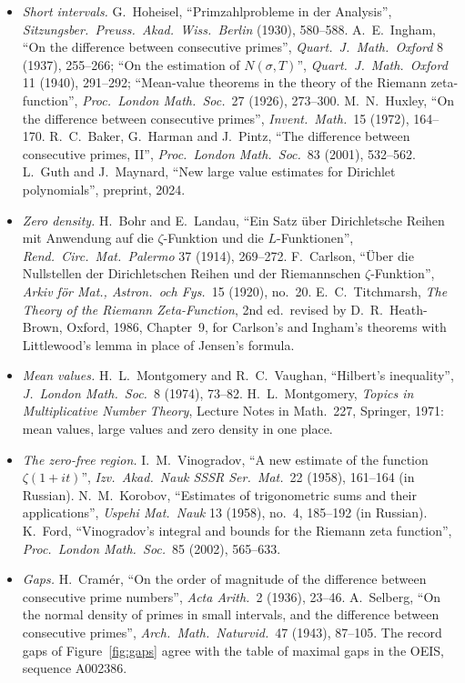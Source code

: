 \begin{itemize}
\item \emph{Short intervals.} G.~Hoheisel, ``Primzahlprobleme in der Analysis'', \emph{Sitzungsber.\ Preuss.\ Akad.\ Wiss.\ Berlin} (1930), 580--588. A.~E.~Ingham, ``On the difference between consecutive primes'', \emph{Quart.\ J.\ Math.\ Oxford} 8 (1937), 255--266; ``On the estimation of $N(\sigma,T)$'', \emph{Quart.\ J.\ Math.\ Oxford} 11 (1940), 291--292; ``Mean-value theorems in the theory of the Riemann zeta-function'', \emph{Proc.\ London Math.\ Soc.}\ 27 (1926), 273--300. M.~N.~Huxley, ``On the difference between consecutive primes'',
\emph{Invent.\ Math.}\ 15 (1972), 164--170. R.~C.~Baker, G.~Harman and J.~Pintz, ``The difference between consecutive primes, II'', \emph{Proc.\ London Math.\ Soc.}\ 83 (2001), 532--562. L.~Guth and J.~Maynard, ``New large value estimates for Dirichlet polynomials'', preprint, 2024.
\item \emph{Zero density.} H.~Bohr and E.~Landau, ``Ein Satz \"uber Dirichletsche Reihen mit Anwendung auf die $\zeta$-Funktion und die $L$-Funktionen'', \emph{Rend.\ Circ.\ Mat.\ Palermo} 37 (1914), 269--272. F.~Carlson, ``\"Uber die Nullstellen der Dirichletschen Reihen und der Riemannschen $\zeta$-Funktion'', \emph{Arkiv f\"or Mat., Astron.\ och Fys.}\ 15 (1920), no.~20.
E.~C.~Titchmarsh, \emph{The Theory of the Riemann Zeta-Function}, 2nd ed.\ revised by D.~R.~Heath-Brown, Oxford, 1986, Chapter~9, for Carlson's and Ingham's theorems with Littlewood's lemma in place of Jensen's formula.
\item \emph{Mean values.} H.~L.~Montgomery and R.~C.~Vaughan, ``Hilbert's inequality'', \emph{J.\ London Math.\ Soc.}\ 8 (1974), 73--82. H.~L.~Montgomery, \emph{Topics in Multiplicative Number Theory}, Lecture Notes in Math.\ 227, Springer, 1971: mean values, large values and zero density in one place.
\item \emph{The zero-free region.} I.~M.~Vinogradov, ``A new estimate of the function $\zeta(1+it)$'', \emph{Izv.\ Akad.\ Nauk SSSR Ser.\ Mat.}\ 22 (1958), 161--164 (in Russian). N.~M.~Korobov, ``Estimates of trigonometric sums and their applications'', \emph{Uspehi Mat.\ Nauk} 13 (1958), no.~4, 185--192 (in Russian). K.~Ford, ``Vinogradov's integral and bounds for the Riemann zeta function'',
\emph{Proc.\ London Math.\ Soc.}\ 85 (2002), 565--633.
\item \emph{Gaps.} H.~Cram\'er, ``On the order of magnitude of the difference between consecutive prime numbers'', \emph{Acta Arith.}\ 2 (1936), 23--46. A.~Selberg, ``On the normal density of primes in small intervals, and the difference between consecutive primes'', \emph{Arch.\ Math.\ Naturvid.}\ 47 (1943), 87--105. The record gaps of Figure~\ref{fig:gaps} agree with the table of maximal gaps in the OEIS, sequence A002386.
\end{itemize}
